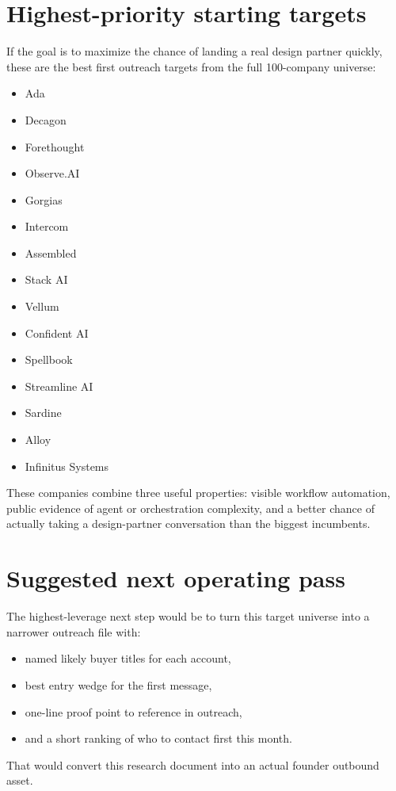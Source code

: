 \documentclass[11pt]{article}
\begin{document}
\section{Highest-priority starting targets}
If the goal is to maximize the chance of landing a real design partner quickly, these are the best first outreach targets from the full 100-company universe:
\begin{itemize}
\item Ada
\item Decagon
\item Forethought
\item Observe.AI
\item Gorgias
\item Intercom
\item Assembled
\item Stack AI
\item Vellum
\item Confident AI
\item Spellbook
\item Streamline AI
\item Sardine
\item Alloy
\item Infinitus Systems
\end{itemize}
These companies combine three useful properties: visible workflow automation, public evidence of agent or orchestration complexity, and a better chance of actually taking a design-partner conversation than the biggest incumbents.

\section{Suggested next operating pass}
The highest-leverage next step would be to turn this target universe into a narrower outreach file with:
\begin{itemize}
\item named likely buyer titles for each account,
\item best entry wedge for the first message,
\item one-line proof point to reference in outreach,
\item and a short ranking of who to contact first this month.
\end{itemize}
That would convert this research document into an actual founder outbound asset.
\end{document}
